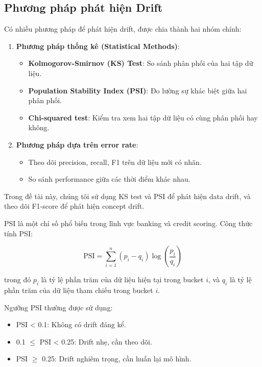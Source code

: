 \subsection{Phương pháp phát hiện Drift}

Có nhiều phương pháp để phát hiện drift, được chia thành hai nhóm chính:

\begin{enumerate}
    \item \textbf{Phương pháp thống kê (Statistical Methods)}:
    \begin{itemize}
        \item \textbf{Kolmogorov-Smirnov (KS) Test}: So sánh phân phối của hai tập dữ liệu.
        \item \textbf{Population Stability Index (PSI)}: Đo lường sự khác biệt giữa hai phân phối.
        \item \textbf{Chi-squared test}: Kiểm tra xem hai tập dữ liệu có cùng phân phối hay không.
    \end{itemize}
    
    \item \textbf{Phương pháp dựa trên error rate}:
    \begin{itemize}
        \item Theo dõi precision, recall, F1 trên dữ liệu mới có nhãn.
        \item So sánh performance giữa các thời điểm khác nhau.
    \end{itemize}
\end{enumerate}

Trong đề tài này, chúng tôi sử dụng KS test và PSI để phát hiện data drift, và theo dõi F1-score để phát hiện concept drift.

PSI là một chỉ số phổ biến trong lĩnh vực banking và credit scoring. Công thức tính PSI:

\begin{equation}
\text{PSI} = \sum_{i=1}^{n} (p_i - q_i) \log\left(\frac{p_i}{q_i}\right)
\end{equation}

trong đó $p_i$ là tỷ lệ phần trăm của dữ liệu hiện tại trong bucket $i$, và $q_i$ là tỷ lệ phần trăm của dữ liệu tham chiếu trong bucket $i$.

Ngưỡng PSI thường được sử dụng:
\begin{itemize}
    \item PSI < 0.1: Không có drift đáng kể.
    \item 0.1 $\le$ PSI < 0.25: Drift nhẹ, cần theo dõi.
    \item PSI $\ge$ 0.25: Drift nghiêm trọng, cần huấn lại mô hình.
\end{itemize}

